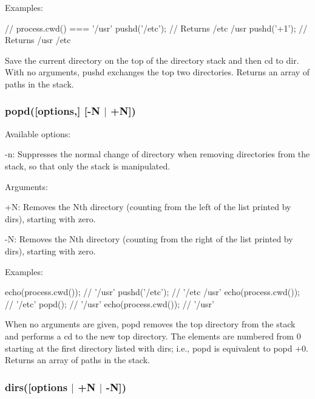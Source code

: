 Examples\+:


\begin{DoxyCode}
// process.cwd() === '/usr'
pushd('/etc'); // Returns /etc /usr
pushd('+1');   // Returns /usr /etc
\end{DoxyCode}


Save the current directory on the top of the directory stack and then cd to {\ttfamily dir}. With no arguments, pushd exchanges the top two directories. Returns an array of paths in the stack.

\subsubsection*{popd(\mbox{[}options,\mbox{]} \mbox{[}\textquotesingle{}-\/N\textquotesingle{} $\vert$ \textquotesingle{}+N\textquotesingle{}\mbox{]})}

Available options\+:


\begin{DoxyItemize}
\item {\ttfamily -\/n}\+: Suppresses the normal change of directory when removing directories from the stack, so that only the stack is manipulated.
\end{DoxyItemize}

Arguments\+:


\begin{DoxyItemize}
\item {\ttfamily +N}\+: Removes the Nth directory (counting from the left of the list printed by dirs), starting with zero.
\item {\ttfamily -\/N}\+: Removes the Nth directory (counting from the right of the list printed by dirs), starting with zero.
\end{DoxyItemize}

Examples\+:


\begin{DoxyCode}
echo(process.cwd()); // '/usr'
pushd('/etc');       // '/etc /usr'
echo(process.cwd()); // '/etc'
popd();              // '/usr'
echo(process.cwd()); // '/usr'
\end{DoxyCode}


When no arguments are given, popd removes the top directory from the stack and performs a cd to the new top directory. The elements are numbered from 0 starting at the first directory listed with dirs; i.\+e., popd is equivalent to popd +0. Returns an array of paths in the stack.

\subsubsection*{dirs(\mbox{[}options $\vert$ \textquotesingle{}+N\textquotesingle{} $\vert$ \textquotesingle{}-\/N\textquotesingle{}\mbox{]})}

